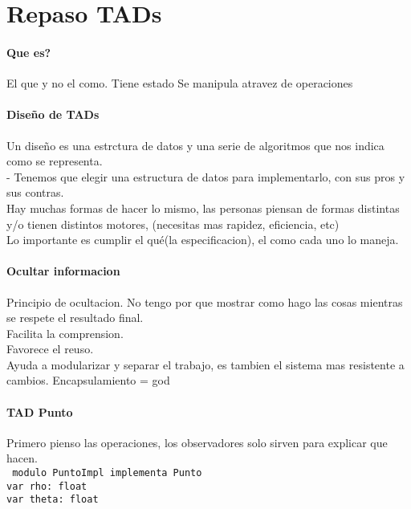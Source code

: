 \documentclass[10pt,a4paper]{article}
\begin{document}
\section*{Repaso TADs}
\paragraph*{Que es?}
El que y no el como.
Tiene estado
Se manipula atravez de operaciones
\paragraph*{Diseño de TADs}
Un diseño es una estrctura de datos y una serie de algoritmos que nos indica como se representa.
\\- Tenemos que elegir una estructura de datos para implementarlo, con sus pros y sus contras.
\\Hay muchas formas de hacer lo mismo, las personas piensan de formas distintas y/o tienen distintos motores, (necesitas mas rapidez, eficiencia, etc)
\\Lo importante es cumplir el qué(la especificacion), el como cada uno lo maneja.
\paragraph*{Ocultar informacion}
Principio de ocultacion. No tengo por que mostrar como hago las cosas mientras se respete el resultado final.
\\Facilita la comprension.
\\Favorece el reuso.
\\Ayuda a modularizar y separar el trabajo, es tambien el sistema mas resistente a cambios.
\salto{\baselineskip}
Encapsulamiento = god
\paragraph*{TAD Punto}
Primero pienso las operaciones, los observadores solo sirven para explicar que hacen.
\\\texttt{
    modulo PuntoImpl implementa Punto
        \\var rho: float
        \\var theta: float
}
\end{document}
